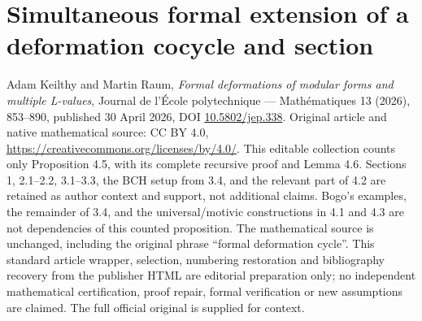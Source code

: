 \section*{Simultaneous formal extension of a deformation cocycle and section}
Adam Keilthy and Martin Raum, \emph{Formal deformations of modular forms and multiple L-values}, Journal de l'École polytechnique --- Mathématiques 13 (2026), 853--890, published 30 April 2026, DOI \href{https://doi.org/10.5802/jep.338}{10.5802/jep.338}. Original article and native mathematical source: CC BY 4.0, \url{https://creativecommons.org/licenses/by/4.0/}.
This editable collection counts only Proposition 4.5, with its complete recursive proof and Lemma 4.6. Sections 1, 2.1--2.2, 3.1--3.3, the BCH setup from 3.4, and the relevant part of 4.2 are retained as author context and support, not additional claims. Bogo's examples, the remainder of 3.4, and the universal/motivic constructions in 4.1 and 4.3 are not dependencies of this counted proposition.
The mathematical source is unchanged, including the original phrase ``formal deformation cycle''. This standard article wrapper, selection, numbering restoration and bibliography recovery from the publisher HTML are editorial preparation only; no independent mathematical certification, proof repair, formal verification or new assumptions are claimed. The full official original is supplied for context.
